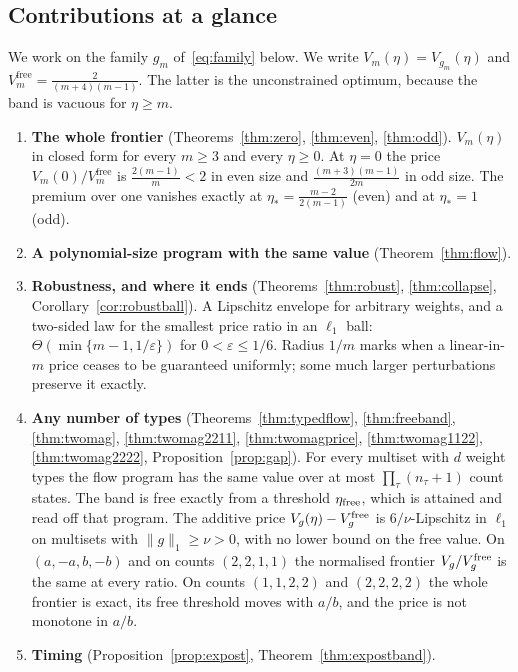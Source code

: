 \documentclass[conference]{IEEEtran}
\theoremstyle{definition}
\begin{document}
\subsection{Contributions at a glance}

We work on the family $g_{m}$ of~\eqref{eq:family} below. We write
$V_{m}(\eta)=V_{g_{m}}(\eta)$ and $V^{\mathrm{free}}_{m}=\frac{2}{(m+4)(m-1)}$. The latter is
the unconstrained optimum, because the band is vacuous for $\eta\ge m$.

\begin{enumerate}
\item[1)] \textbf{The whole frontier} (Theorems~\ref{thm:zero}, \ref{thm:even},
\ref{thm:odd}). $V_{m}(\eta)$ in closed form for every $m\ge3$ and every $\eta\ge0$. At
$\eta=0$ the price $V_{m}(0)/V^{\mathrm{free}}_{m}$ is $\frac{2(m-1)}{m}<2$ in even size and
$\frac{(m+3)(m-1)}{2m}$ in odd size. The premium over one vanishes exactly at $\eta_{*}=\frac{m-2}{2(m-1)}$
(even) and at $\eta_{*}=1$ (odd).
\item[2)] \textbf{A polynomial-size program with the same value} (Theorem~\ref{thm:flow}).
\item[3)] \textbf{Robustness, and where it ends} (Theorems~\ref{thm:robust},
\ref{thm:collapse}, Corollary~\ref{cor:robustball}). A Lipschitz envelope for arbitrary
weights, and a two-sided law for the smallest price ratio in an $\ell_1$ ball:
$\Theta(\min\{m-1,1/\varepsilon\})$ for $0<\varepsilon\le1/6$.
Radius $1/m$ marks when a linear-in-$m$ price ceases to be guaranteed uniformly;
some much larger perturbations preserve it exactly.
\item[4)] \textbf{Any number of types} (Theorems~\ref{thm:typedflow}, \ref{thm:freeband},
\ref{thm:twomag}, \ref{thm:twomag2211}, \ref{thm:twomagprice}, \ref{thm:twomag1122},
\ref{thm:twomag2222}, Proposition~\ref{prop:gap}). For every multiset with $d$ weight types the flow program has the
same value over at most $\prod_\tau(n_\tau+1)$ count states. The band is free exactly from a threshold
$\eta_{\rm free}$, which is attained and read off that program. The additive price
$V_g(\eta)-V^{\rm free}_g$ is $6/\nu$-Lipschitz in $\ell_1$ on multisets with $\|g\|_1\ge\nu>0$, with
no lower bound on the free value.
On $(a,-a,b,-b)$ and on counts $(2,2,1,1)$ the normalised frontier $V_g/V_g^{\rm free}$ is the same at
every ratio. On counts $(1,1,2,2)$ and $(2,2,2,2)$ the whole frontier is exact, its free threshold moves with
$a/b$, and the price is not monotone in $a/b$.
\item[5)] \textbf{Timing} (Proposition~\ref{prop:expost}, Theorem~\ref{thm:expostband}).

\end{enumerate}
\end{document}
